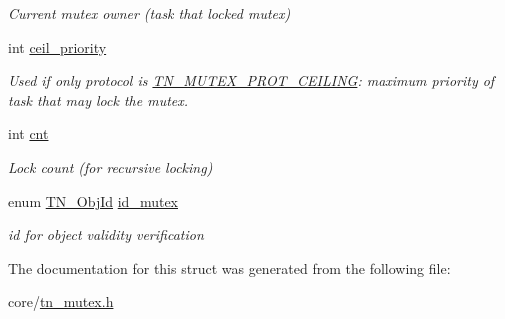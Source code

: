 \begin{DoxyCompactItemize}
\begin{DoxyCompactList}\small\item\em Current mutex owner (task that locked mutex) \end{DoxyCompactList}\item 
\hypertarget{structTN__Mutex_a98bfc437aae2a8841fd5538f2b0c2618}{int \hyperlink{structTN__Mutex_a98bfc437aae2a8841fd5538f2b0c2618}{ceil\+\_\+priority}}\label{structTN__Mutex_a98bfc437aae2a8841fd5538f2b0c2618}

\begin{DoxyCompactList}\small\item\em Used if only protocol is {\ttfamily \hyperlink{tn__mutex_8h_a11357f7bb31a3b380cbe94e0913a5b40a8edebcfa37593a4d2d541954ce3aea67}{T\+N\+\_\+\+M\+U\+T\+E\+X\+\_\+\+P\+R\+O\+T\+\_\+\+C\+E\+I\+L\+I\+N\+G}}\+: maximum priority of task that may lock the mutex. \end{DoxyCompactList}\item 
\hypertarget{structTN__Mutex_a7c367d7a5c5d8a640fd00b1fe4c9d461}{int \hyperlink{structTN__Mutex_a7c367d7a5c5d8a640fd00b1fe4c9d461}{cnt}}\label{structTN__Mutex_a7c367d7a5c5d8a640fd00b1fe4c9d461}

\begin{DoxyCompactList}\small\item\em Lock count (for recursive locking) \end{DoxyCompactList}\item 
\hypertarget{structTN__Mutex_a09b2fb7b45cab984dd3db1c9d1d3b5b4}{enum \hyperlink{tn__common_8h_ae779dd1f6735f6e139fb70acd004d976}{T\+N\+\_\+\+Obj\+Id} \hyperlink{structTN__Mutex_a09b2fb7b45cab984dd3db1c9d1d3b5b4}{id\+\_\+mutex}}\label{structTN__Mutex_a09b2fb7b45cab984dd3db1c9d1d3b5b4}

\begin{DoxyCompactList}\small\item\em id for object validity verification \end{DoxyCompactList}\end{DoxyCompactItemize}


The documentation for this struct was generated from the following file\+:\begin{DoxyCompactItemize}
\item 
core/\hyperlink{tn__mutex_8h}{tn\+\_\+mutex.\+h}\end{DoxyCompactItemize}
